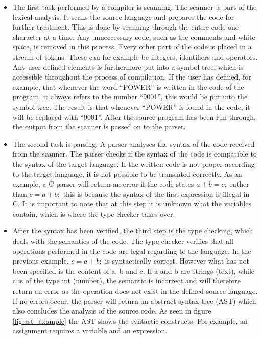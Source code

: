 \begin{itemize}
	\item The first task performed by a compiler is scanning. The scanner is part of the lexical analysis. It scans the source language and prepares the code for further treatment. This is done by scanning through the entire code one character at a time. Any unneccessary code, such as the comments and white space, is removed in this process. Every other part of the code is placed in a stream of tokens. These can for example be integers, identifiers and operators. Any user defined elements is furthermore put into a symbol tree, which is accessible throughout the process of compilation. If the user has defined, for example, that whenever the word ``POWER'' is written in the code of the program, it always refers to the number ``9001'', this would be put into the symbol tree. The result is that whenever ``POWER'' is found in the code, it will be replaced with ``9001''. After the source program has been run through, the output from the scanner is passed on to the parser.
	
	\item The second task is parsing. A parser analyses the syntax of the code received from the scanner. The parser checks if the syntax of the code is compatible to the syntax of the target language. If the written code is not proper according to the target language, it is not possible to be translated correctly. As an example, a C parser will return an error if the code states $a + b = c;$ rather than $c = a + b;$ this is because the syntax of the first expression is illegal in C. It is important to note that at this step it is unknown what the variables contain, which is where the type checker takes over.

	\item After the syntax has been verified, the third step is the type checking, which deals with the semantics of the code. The type checker verifies that all operations performed in the code are legal regarding to the language. In the previous example, $c = a + b;$ is syntactically correct. However what has not been specified is the content of a, b and c. If a and b are strings (text), while c is of the type int (number), the semantic is incorrect and will therefore return an error as the operation does not exist in the defined source language. If no errors occur, the parser will return an abstract syntax tree (AST) which also concludes the analysis of the source code. As seen in figure \ref{fig:ast_example} the AST shows the syntactic constructs. For example, an assignment requires a variable and an expression. 
	

\end{itemize}
